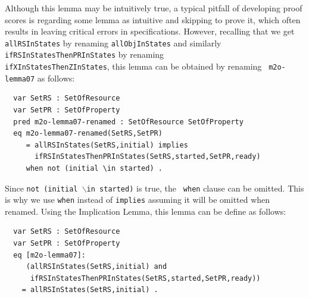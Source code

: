 \documentclass[12pt]{report}
\newcommand{\stt}[1]{{\small{\tt {#1}}}}
\begin{document}
\normalsize
Although this lemma may be intuitively true, a typical pitfall of
developing proof scores is regarding some lemma as intuitive and
skipping to prove it, which often results in leaving critical errors
in specifications. However, recalling that we get {\tt allRSInStates}
by renaming {\tt allObjInStates} and similarly
{\tt ifRSInStatesThenPRInStates} by renaming\\
{\tt ifXInStatesThenZInStates}, this lemma can be obtained by renaming {\tt
  m2o-lemma07} as follows:
\small
\begin{verbatim}
  var SetRS : SetOfResource
  var SetPR : SetOfProperty
  pred m2o-lemma07-renamed : SetOfResource SetOfProperty
  eq m2o-lemma07-renamed(SetRS,SetPR)
     = allRSInStates(SetRS,initial) implies 
       ifRSInStatesThenPRInStates(SetRS,started,SetPR,ready)
     when not (initial \in started) .
\end{verbatim}
\normalsize
Since \stt{not (initial $\backslash$in started)} is true, the {\tt
  when} clause can be omitted. This is why we use {\tt when} instead
of {\tt implies} assuming it will be omitted when renamed. Using the
Implication Lemma, this lemma can be define as follows:
\small
\begin{verbatim}
  var SetRS : SetOfResource
  var SetPR : SetOfProperty
  eq [m2o-lemma07]:
     (allRSInStates(SetRS,initial) and
      ifRSInStatesThenPRInStates(SetRS,started,SetPR,ready))
    = allRSInStates(SetRS,initial) .
\end{verbatim}
\normalsize
\end{document}
